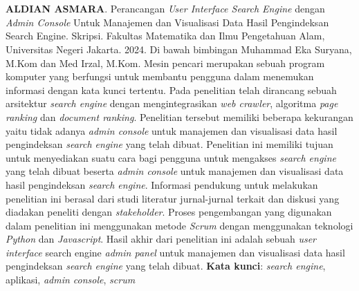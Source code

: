 \chapter*{}

\begin{spacing}{1}
	\textbf{ALDIAN ASMARA}. Perancangan \emph{User Interface Search Engine} dengan \textit{Admin Console} Untuk Manajemen dan Visualisasi Data Hasil Pengindeksan Search Engine. Skripsi. Fakultas Matematika dan Ilmu Pengetahuan Alam, Universitas Negeri Jakarta. 2024. Di bawah bimbingan Muhammad Eka Suryana, M.Kom dan Med Irzal, M.Kom.
	\newline
	\newline
	Mesin pencari merupakan sebuah program komputer yang berfungsi untuk membantu pengguna dalam menemukan informasi dengan kata kunci tertentu. Pada penelitian \citep{lazu} telah dirancang sebuah arsitektur \textit{search engine} dengan mengintegrasikan \textit{web crawler}, algoritma \textit{page ranking} dan \textit{document ranking}. Penelitian tersebut memiliki beberapa kekurangan yaitu tidak adanya \textit{admin console} untuk manajemen dan visualisasi data hasil pengindeksan \textit{search engine} yang telah dibuat. Penelitian ini memiliki tujuan untuk menyediakan suatu cara bagi pengguna untuk mengakses \textit{search engine} yang telah dibuat beserta \textit{admin console} untuk manajemen dan visualisasi data hasil pengindeksan \textit{search engine}. Informasi pendukung untuk melakukan penelitian ini berasal dari studi literatur jurnal-jurnal terkait dan diskusi yang diadakan peneliti dengan \textit{stakeholder}. Proses pengembangan yang digunakan dalam penelitian ini menggunakan metode \textit{Scrum} dengan menggunakan teknologi \textit{Python} dan \textit{Javascript}. Hasil akhir dari penelitian ini adalah sebuah  \textit{user interface} search engine \textit{admin panel} untuk manajemen dan visualisasi data hasil pengindeksan \textit{search engine} yang telah dibuat.
	\newline
	\newline
	\noindent \textbf{Kata kunci}:  \textit{search engine}, aplikasi, \textit{admin console}, \textit{scrum}
\end{spacing}

